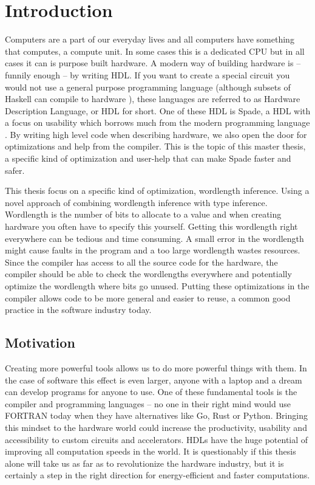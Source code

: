 \documentclass[msc,lith,english]{liuthesis}
\author{Edvard Thörnros}
\begin{document}
\chapter{Introduction}
\label{chaIntro}
Computers are a part of our everyday lives and all computers have something that computes, a compute unit. In some cases this is a dedicated CPU but in all cases it can is purpose built hardware. A modern way of building hardware is -- funnily enough -- by writing HDL. If you want to create a special circuit you would not use a general purpose programming language (although subsets of Haskell can compile to hardware \cite{src:ClashExists}), these languages are referred to as Hardware Description Language, or HDL for short. One of these HDL is Spade, a HDL with a focus on usability which borrows much from the modern programming language \cite{src:spadeSomething} \cite{src:spadeAnHDL}. By writing high level code when describing hardware, we also open the door for optimizations and help from the compiler. This is the topic of this master thesis, a specific kind of optimization and user-help that can make Spade faster and safer.

This thesis focus on a specific kind of optimization, wordlength inference. Using a novel approach of combining wordlength inference with type inference. Wordlength is the number of bits to allocate to a value and when creating hardware you often have to specify this yourself. Getting this wordlength right everywhere can be tedious and time consuming. A small error in the wordlength might cause faults in the program and a too large wordlength wastes resources. %
Since the compiler has access to all the source code for the hardware, the compiler should be able to check the wordlengths everywhere and potentially optimize the wordlength where bits go unused. Putting these optimizations in the compiler allows code to be more general and easier to reuse, a common good practice in the software industry today. 

\section{Motivation}
Creating more powerful tools allows us to do more powerful things with them. In the case of software this effect is even larger, anyone with a laptop and a dream can develop programs for anyone to use. One of these fundamental tools is the compiler and programming languages -- no one in their right mind would use FORTRAN today when they have alternatives like Go, Rust or Python. Bringing this mindset to the hardware world could increase the productivity, usability and accessibility to custom circuits and accelerators. HDLs have the huge potential of improving all computation speeds in the world. It is questionably if this thesis alone will take us as far as to revolutionize the hardware industry, but it is certainly a step in the right direction for energy-efficient and faster computations.
\end{document}
